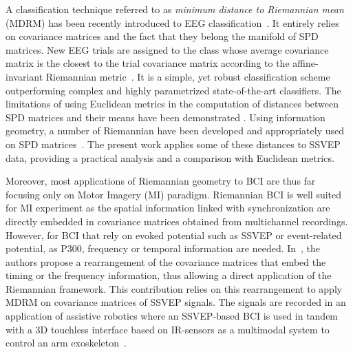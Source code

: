 A classification technique referred to as \emph{minimum distance to Riemannian mean} (MDRM) has been recently introduced to EEG classification~\cite{barachant_multiclass_2012}. 
It entirely relies on covariance matrices and the fact that they belong the manifold of SPD matrices.
New EEG trials are assigned to the class whose average covariance matrix is the closest to the trial covariance matrix according to the affine-invariant Riemannian metric~\cite{moakher_differential_2005}.
It is a simple, yet robust classification scheme outperforming complex and highly parametrized state-of-the-art classifiers. 
The limitations of using Euclidean metrics in the computation of distances between SPD matrices and their means have been demonstrated \cite{arsigny_geometric_2007}. 
Using information geometry, a number of Riemannian  have been developed and appropriately used on SPD matrices~\cite{amari_-divergence_2009,arsigny_geometric_2007}. %
The present work applies some of these distances to SSVEP data, providing a practical analysis and a comparison with Euclidean metrics.

Moreover, %
most applications of Riemannian geometry to BCI are thus far focusing only on Motor Imagery (MI) paradigm.
Riemannian BCI is well suited for MI experiment as the spatial information linked with synchronization are directly embedded in covariance matrices obtained from multichannel recordings.
However, for BCI that rely on evoked potential such as SSVEP or event-related potential, as P300, frequency or temporal information are needed. %
In~\cite{congedo_new_2013}, the authors propose a rearrangement of the covariance matrices that embed the timing or the frequency information, thus allowing a direct application of the Riemannian framework.  
This contribution relies on this rearrangement to apply MDRM on covariance matrices of SSVEP signals.
The signals are recorded in an application of assistive robotics where an SSVEP-based BCI is used in tandem with a 3D touchless interface based on IR-sensors as a multimodal system to control an arm exoskeleton~\cite{kalunga_hybrid_2014}.


